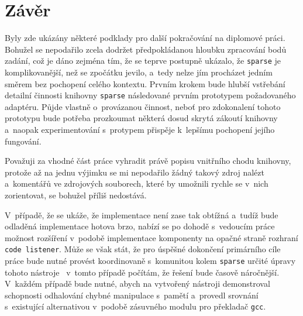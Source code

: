 \chapter{Závěr}
\label{chap:zaver}

Byly zde ukázány některé podklady pro další pokračování na diplomové práci.
Bohužel se nepodařilo zcela dodržet předpokládanou hloubku zpracování
bodů zadání, což je dáno zejména tím, že se teprve postupně ukázalo, že
\texttt{sparse} je komplikovanější, než se zpočátku jevilo, a~tedy
nelze jím procházet jedním směrem bez pochopení celého kontextu.
Prvním krokem bude hlubší vstřebání detailní činnosti knihovny \texttt{sparse}
následované prvním prototypem požadovaného adaptéru. Půjde vlastně o~provázanou
činnost, neboť pro zdokonalení tohoto prototypu bude potřeba prozkoumat některá
dosud skrytá zákoutí knihovny a~naopak experimentování s~protypem přispěje
k~lepšímu pochopení jejího fungování.

Považuji za vhodné část práce vyhradit právě popisu vnitřního chodu knihovny,
protože až na jednu výjimku se mi nepodařilo žádný takový zdroj nalézt
a~komentářů ve zdrojových souborech, které by umožnili rychle se v~nich
zorientovat, se bohužel příliš nedostává.

V~případě, že se ukáže, že implementace není zase tak obtížná a~tudíž
bude odladěná implementace hotova brzo, nabízí se po dohodě s~vedoucím
práce možnost rozšíření v~podobě implementace komponenty na opačné straně
rozhraní \texttt{code listener}. Může se však stát, že pro úspěšné dokončení
primárního cíle práce bude nutné provést koordinovaně s~komunitou kolem
\texttt{sparse} určité úpravy tohoto nástroje \ndash\ v~tomto případě
počítám, že řešení bude časově náročnější. V~každém případě bude nutné,
abych na vytvořený nástroji demonstroval schopnosti odhalování chybné
manipulace s~pamětí a~provedl srovnání s~existující alternativou
v~podobě zásuvného modulu pro překladač \texttt{gcc}.
